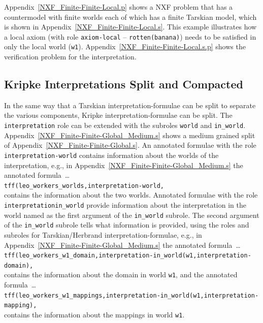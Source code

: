\documentclass{easychair}
\newcommand{\smalltt}[1]{\small \texttt{#1}}
\begin{document}
Appendix~\ref{NXF_Finite-Finite-Local.p} shows a NXF problem that has a countermodel with
finite worlds each of which has a finite Tarskian model, which is shown in
Appendix~\ref{NXF_Finite-Finite-Local.s}.
This example illustrates how a local axiom (with role {\tt axiom-local} -- {\tt rotten(banana)})
needs to be satisfied in only the local world ({\tt w1}).
Appendix~\ref{NXF_Finite-Finite-Local.s.p} shows the verification problem for the interpretation.

\subsection{Kripke Interpretations Split and Compacted}
\label{NewKripkeSplitCompact}

In the same way that a Tarskian interpretation-formulae can be split to separate the various 
components, Kripke interpretation-formulae can be split.
The {\tt interpretation} role can be extended with the subroles {\tt world} and {\tt in\_world}.
Appendix~\ref{NXF_Finite-Finite-Global_Medium.s} shows a medium grained split of 
Appendix~\ref{NXF_Finite-Finite-Global.s}.
An annotated formulae with the role {\tt interpretation-world} contains information about the
worlds of the interpretation, e.g., in Appendix~\ref{NXF_Finite-Finite-Global_Medium.s} the
annotated formula~\ldots \\
\hspace*{0.5cm}\smalltt{tff(leo\_workers\_worlds,interpretation-world,} \\
contains the information about the two worlds.
Annotated formulae with the role {\tt interpretation\-in\_world} provide information about the
interpretation in the world named as the first argument of the {\tt in\_world} subrole.
The second argument of the {\tt in\_world} subrole tells what information is provided, using the
roles and subroles for Tarskian/Herbrand interpretation-formulae, e.g., in 
Appendix~\ref{NXF_Finite-Finite-Global_Medium.s} the annotated formula~\ldots \\
\hspace*{0.5cm}\smalltt{tff(leo\_workers\_w1\_domain,interpretation-in\_world(w1,interpretation-domain),} \\
contains the information about the domain in world {\tt w1}, and the annotated formula~\ldots \\
\hspace*{0.5cm}\smalltt{tff(leo\_workers\_w1\_mappings,interpretation-in\_world(w1,interpretation-mapping),} \\
contains the information about the mappings in world {\tt w1}.
\end{document}
